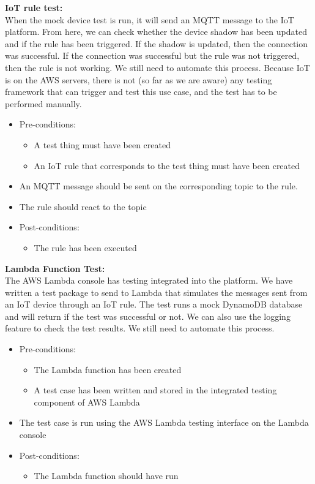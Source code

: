 \documentclass{article}
\begin{document}
			\textbf{IoT rule test:}
			\\
			When the mock device test is run, it will send an MQTT message to the IoT platform. From here, we can check whether the device shadow has been updated and if the rule has been triggered. If the shadow is updated, then the connection was successful. If the connection was successful but the rule was not triggered, then the rule is not working. We still need to automate this process. Because IoT is on the AWS servers, there is not (so far as we are aware) any testing framework that can trigger and test this use case, and the test has to be performed manually.
			\begin{itemize}
				\item Pre-conditions:
				\begin{itemize}
					\item A test thing must have been created
					\item An IoT rule that corresponds to the test thing must have been created
				\end{itemize}
				\item An MQTT message should be sent on the corresponding topic to the rule.
				\item The rule should react to the topic
				\item Post-conditions:
				\begin{itemize}
					\item The rule has been executed
				\end{itemize}
			\end{itemize}
			
			\textbf{Lambda Function Test:}
			\\
			The AWS Lambda console has testing integrated into the platform. We have written a test package to send to Lambda that simulates the messages sent from an IoT device through an IoT rule. The test runs a mock DynamoDB database and will return if the test was successful or not. We can also use the logging feature to check the test results. We still need to automate this process.
			\begin{itemize}
				\item Pre-conditions:
				\begin{itemize}
					\item The Lambda function has been created
					\item A test case has been written and stored in the integrated testing component of AWS Lambda
				\end{itemize}
				\item The test case is run using the AWS Lambda testing interface on the Lambda console
				\item Post-conditions:
				\begin{itemize}
					\item The Lambda function should have run
				\end{itemize}
			\end{itemize}
			
\end{document}
